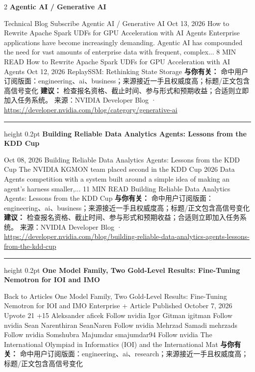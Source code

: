 \documentclass[10.5pt]{ctexart}
\begin{document}
\begin{multicols}{2}
{\large\bfseries Agentic AI / Generative AI}\par
Technical Blog Subscribe Agentic AI / Generative AI Oct 13, 2026 How to Rewrite Apache Spark UDFs for GPU Acceleration with AI Agents Enterprise applications have become increasingly demanding. Agentic AI has compounded the need for vast amounts of enterprise data with frequent, complex... 8 MIN READ How to Rewrite Apache Spark UDFs for GPU Acceleration with AI Agents Oct 12, 2026 ReplaySSM: Rethinking State Storage 
\textbf{与你有关：} 命中用户订阅版面：engineering、ai、business；来源接近一手且权威度高；标题/正文包含高信号变化
\textbf{建议：} 检查报名资格、截止时间、参与形式和预期收益；合适则立即加入任务系统。
{\footnotesize\color{ormuted} 来源：NVIDIA Developer Blog · \url{https://developer.nvidia.com/blog/category/generative-ai}}
\vspace{2mm}
\hrule height 0.2pt
\vspace{2mm}
{\large\bfseries Building Reliable Data Analytics Agents: Lessons from the KDD Cup}\par
Oct 08, 2026 Building Reliable Data Analytics Agents: Lessons from the KDD Cup The NVIDIA KGMON team placed second in the KDD Cup 2026 Data Agents competition with a system built around a simple idea of making an agent's harness smaller,... 11 MIN READ Building Reliable Data Analytics Agents: Lessons from the KDD Cup
\textbf{与你有关：} 命中用户订阅版面：engineering、ai、business；来源接近一手且权威度高；标题/正文包含高信号变化
\textbf{建议：} 检查报名资格、截止时间、参与形式和预期收益；合适则立即加入任务系统。
{\footnotesize\color{ormuted} 来源：NVIDIA Developer Blog · \url{https://developer.nvidia.com/blog/building-reliable-data-analytics-agents-lessons-from-the-kdd-cup}}
\vspace{2mm}
\hrule height 0.2pt
\vspace{2mm}
{\large\bfseries One Model Family, Two Gold-Level Results: Fine-Tuning Nemotron for IOI and IMO}\par
Back to Articles One Model Family, Two Gold-Level Results: Fine-Tuning Nemotron for IOI and IMO Enterprise + Article Published October 7, 2026 Upvote 21 +15 Aleksander aficek Follow nvidia Igor Gitman igitman Follow nvidia Sean Narenthiran SeanNaren Follow nvidia Mehrzad Samadi mehrzads Follow nvidia Somshubra Majumdar smajumdar94 Follow nvidia The International Olympiad in Informatics (IOI) and the International Mat
\textbf{与你有关：} 命中用户订阅版面：engineering、ai、research；来源接近一手且权威度高；标题/正文包含高信号变化

\end{multicols}
\end{document}
